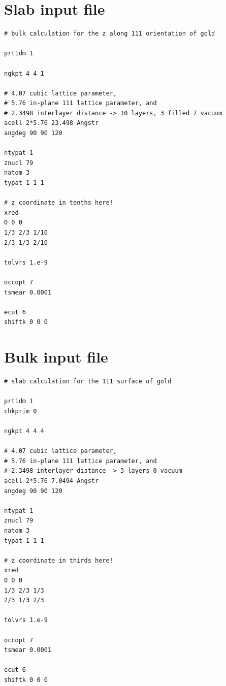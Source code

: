 \documentclass{report}
\begin{document}
\section{Slab input file}
\begin{verbatim}
# bulk calculation for the z along 111 orientation of gold

prt1dm 1

ngkpt 4 4 1

# 4.07 cubic lattice parameter, 
# 5.76 in-plane 111 lattice parameter, and 
# 2.3498 interlayer distance -> 10 layers, 3 filled 7 vacuum
acell 2*5.76 23.498 Angstr
angdeg 90 90 120

ntypat 1
znucl 79
natom 3
typat 1 1 1

# z coordinate in tenths here!
xred
0 0 0
1/3 2/3 1/10
2/3 1/3 2/10

tolvrs 1.e-9

occopt 7
tsmear 0.0001

ecut 6
shiftk 0 0 0
\end{verbatim}

\section{Bulk input file}
\begin{verbatim}
# slab calculation for the 111 surface of gold

prt1dm 1
chkprim 0

ngkpt 4 4 4

# 4.07 cubic lattice parameter, 
# 5.76 in-plane 111 lattice parameter, and 
# 2.3498 interlayer distance -> 3 layers 0 vacuum
acell 2*5.76 7.0494 Angstr
angdeg 90 90 120

ntypat 1
znucl 79
natom 3
typat 1 1 1

# z coordinate in thirds here!
xred 
0 0 0
1/3 2/3 1/3
2/3 1/3 2/3

tolvrs 1.e-9

occopt 7
tsmear 0.0001

ecut 6
shiftk 0 0 0
\end{verbatim}
\end{document}
